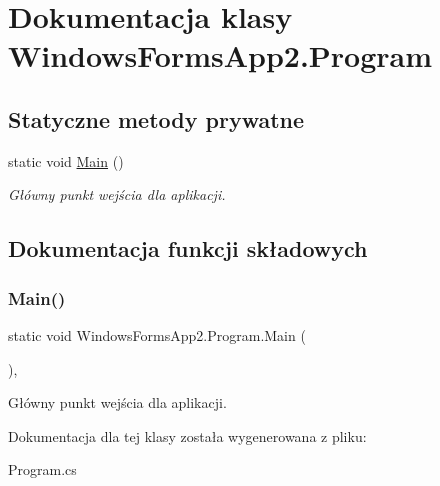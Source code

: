 \hypertarget{class_windows_forms_app2_1_1_program}{}\section{Dokumentacja klasy Windows\+Forms\+App2.\+Program}
\label{class_windows_forms_app2_1_1_program}
\subsection*{Statyczne metody prywatne}
\begin{DoxyCompactItemize}
\item 
static void \hyperlink{class_windows_forms_app2_1_1_program_aa742224747f9ce5e02ea3099ff23c239}{Main} ()
\begin{DoxyCompactList}\small\item\em Główny punkt wejścia dla aplikacji. \end{DoxyCompactList}\end{DoxyCompactItemize}


\subsection{Dokumentacja funkcji składowych}
\mbox{\label{class_windows_forms_app2_1_1_program_aa742224747f9ce5e02ea3099ff23c239}} 
\subsubsection{\texorpdfstring{Main()}{Main()}}
{\footnotesize\ttfamily static void Windows\+Forms\+App2.\+Program.\+Main (\begin{DoxyParamCaption}{ }\end{DoxyParamCaption})\hspace{0.3cm}{\ttfamily [static]}, {\ttfamily [private]}}



Główny punkt wejścia dla aplikacji. 



Dokumentacja dla tej klasy została wygenerowana z pliku\+:\begin{DoxyCompactItemize}
\item 
Program.\+cs\end{DoxyCompactItemize}
